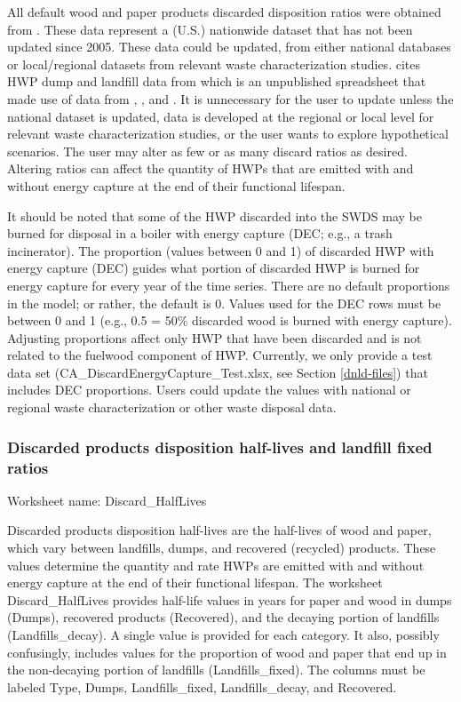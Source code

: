 \documentclass[
  openany]{book}
\begin{document}
All default wood and paper products discarded disposition ratios were obtained from \textcite{skog2008}. These data represent a (U.S.) nationwide dataset that has not been updated since 2005. These data could be updated, from either national databases or local/regional datasets from relevant waste characterization studies. \textcite{skog2008} cites HWP dump and landfill data from \textcite{freed2004} which is an unpublished spreadsheet that made use of data from \textcite{epa2006}, \textcite{melosi1982}, and \textcite{melosi1999}. It is unnecessary for the user to update unless the national dataset is updated, data is developed at the regional or local level for relevant waste characterization studies, or the user wants to explore hypothetical scenarios. The user may alter as few or as many discard ratios as desired. Altering ratios can affect the quantity of HWPs that are emitted with and without energy capture at the end of their functional lifespan.

It should be noted that some of the HWP discarded into the SWDS may be burned for disposal in a boiler with energy capture (DEC; e.g., a trash incinerator). The proportion (values between 0 and 1) of discarded HWP with energy capture (DEC) guides what portion of discarded HWP is burned for energy capture for every year of the time series. There are no default proportions in the model; or rather, the default is 0. Values used for the DEC rows must be between 0 and 1 (e.g., 0.5 = 50\% discarded wood is burned with energy capture). Adjusting proportions affect only HWP that have been discarded and is not related to the fuelwood component of HWP. Currently, we only provide a test data set (CA\_DiscardEnergyCapture\_Test.xlsx, see Section \ref{dnld-files}) that includes DEC proportions. Users could update the values with national or regional waste characterization or other waste disposal data.

\hypertarget{own-prov-input-discHL}{%
\subsubsection{Discarded products disposition half-lives and landfill fixed ratios}\label{own-prov-input-discHL}}

Worksheet name: Discard\_HalfLives

Discarded products disposition half-lives are the half-lives of wood and paper, which vary between landfills, dumps, and recovered (recycled) products. These values determine the quantity and rate HWPs are emitted with and without energy capture at the end of their functional lifespan. The worksheet Discard\_HalfLives provides half-life values in years for paper and wood in dumps (Dumps), recovered products (Recovered), and the decaying portion of landfills (Landfills\_decay). A single value is provided for each category. It also, possibly confusingly, includes values for the proportion of wood and paper that end up in the non-decaying portion of landfills (Landfills\_fixed). The columns must be labeled Type, Dumps, Landfills\_fixed, Landfills\_decay, and Recovered.
\end{document}
